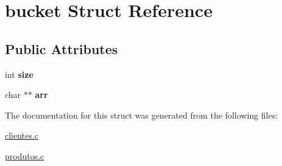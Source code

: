 \hypertarget{structbucket}{}\section{bucket Struct Reference}
\label{structbucket}
\subsection*{Public Attributes}
\begin{DoxyCompactItemize}
\item 
\mbox{\label{structbucket_afe82634d6f8552dffc3097139434a407}} 
int {\bfseries size}
\item 
\mbox{\label{structbucket_ad7541adf4a0ecad66f5c5f34581dedaf}} 
char $\ast$$\ast$ {\bfseries arr}
\end{DoxyCompactItemize}


The documentation for this struct was generated from the following files\+:\begin{DoxyCompactItemize}
\item 
\hyperlink{clientes_8c}{clientes.\+c}\item 
\hyperlink{produtos_8c}{produtos.\+c}\end{DoxyCompactItemize}
